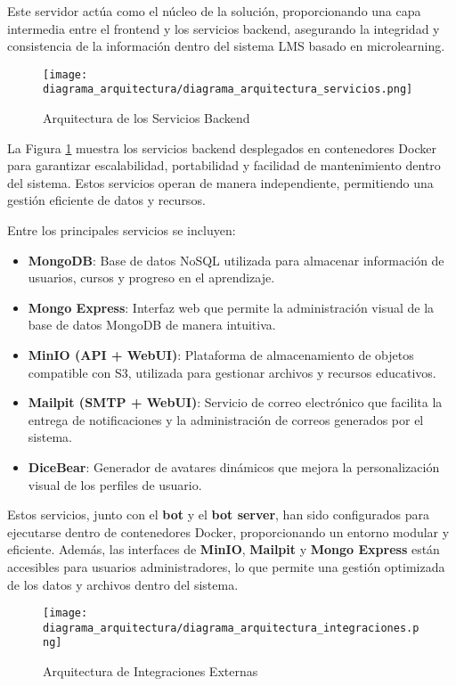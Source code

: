 Este servidor actúa como el núcleo de la solución, proporcionando una capa
intermedia entre el frontend y los servicios backend, asegurando la integridad y
consistencia de la información dentro del sistema LMS basado en microlearning.

\begin{figure}[htbp]
    \centering
    \texttt{[image: diagrama\_arquitectura/diagrama\_arquitectura\_servicios.png]}
    \caption{Arquitectura de los Servicios Backend}
    \label{fig:diagrama_arquitectura_servicios}
\end{figure}

La Figura \ref{fig:diagrama_arquitectura_servicios} muestra los servicios
backend desplegados en contenedores Docker para garantizar escalabilidad, portabilidad y
facilidad de mantenimiento dentro del sistema. Estos servicios operan de manera
independiente, permitiendo una gestión eficiente de datos y recursos.

Entre los principales servicios se incluyen:
\begin{itemize}
    \item \textbf{MongoDB}: Base de datos NoSQL utilizada para almacenar
    información de usuarios, cursos y progreso en el aprendizaje.
    \item \textbf{Mongo Express}: Interfaz web que permite la administración
    visual de la base de datos MongoDB de manera intuitiva.
    \item \textbf{MinIO (API + WebUI)}: Plataforma de almacenamiento de objetos
    compatible con S3, utilizada para gestionar archivos y recursos educativos.
    \item \textbf{Mailpit (SMTP + WebUI)}: Servicio de correo electrónico que
    facilita la entrega de notificaciones y la administración de correos
    generados por el sistema.
    \item \textbf{DiceBear}: Generador de avatares dinámicos que mejora la
    personalización visual de los perfiles de usuario.
\end{itemize}

Estos servicios, junto con el \textbf{bot} y el \textbf{bot server}, han sido
configurados para ejecutarse dentro de contenedores Docker, proporcionando un
entorno modular y eficiente. Además, las interfaces de \textbf{MinIO},
\textbf{Mailpit} y \textbf{Mongo Express} están accesibles para usuarios
administradores, lo que permite una gestión optimizada de los datos y archivos
dentro del sistema.

\begin{figure}[htbp]
    \centering
    \texttt{[image: diagrama\_arquitectura/diagrama\_arquitectura\_integraciones.png]}
    \caption{Arquitectura de Integraciones Externas}
    \label{fig:diagrama_arquitectura_integraciones}
\end{figure}

